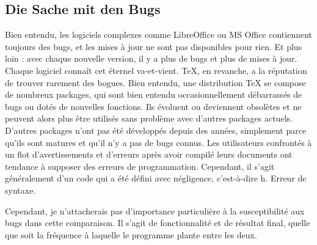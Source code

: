 \documentclass[11pt,a4paper,ngerman,french,DIV=8]{scrartcl}
\begin{document}
\subsection{Die Sache mit den Bugs}

Bien entendu, les logiciels complexes comme LibreOffice ou MS Office contiennent toujours des bugs, et les mises à jour ne sont pas disponibles pour rien. Et plus loin : avec chaque nouvelle version, il y a plus de bugs et plus de mises à jour. Chaque logiciel connaît cet éternel va-et-vient. \TeX{}, en revanche, a la réputation de trouver rarement des bogues. Bien entendu, une distribution \TeX{} se compose de nombreux packages, qui sont bien entendu occasionnellement débarrassés de bugs ou dotés de nouvelles fonctions. Ils évoluent ou deviennent obsolètes et ne peuvent alors plus être utilisés sans problème avec d’autres packages actuels. D'autres packages n'ont pas été développés depuis des années, simplement parce qu'ils sont matures et qu'il n'y a pas de bugs connus. Les utilisateurs confrontés à un flot d’avertissements et d’erreurs après avoir compilé leurs documents ont tendance à supposer des erreurs de programmation. Cependant, il s'agit généralement d'un code qui a été défini avec négligence, c'est-à-dire h. Erreur de syntaxe.

Cependant, je n'attacherais pas d'importance particulière à la susceptibilité aux bugs dans cette comparaison. Il s'agit de fonctionnalité et de résultat final, quelle que soit la fréquence à laquelle le programme plante entre les deux.
\end{document}

